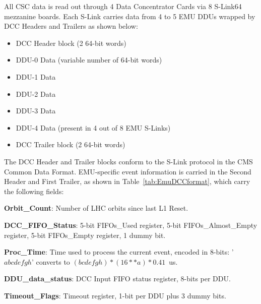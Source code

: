 All CSC data is read out through 4 Data Concentrator Cards
via 8 S-Link64 mezzanine boards.  
Each S-Link carries data from 4 to 5 EMU DDUs wrapped by DCC Headers
and Trailers as shown below:
\begin{itemize}
\item   DCC Header block (2 64-bit words)
\item   DDU-0 Data  (variable number of 64-bit words)
\item   DDU-1 Data
\item   DDU-2 Data
\item   DDU-3 Data
\item   DDU-4 Data  (present in 4 out of 8 EMU S-Links)
\item   DCC Trailer block (2 64-bit words)
\end{itemize}
The DCC Header and Trailer blocks conform to the S-Link protocol in
the CMS Common Data Format.  EMU-specific event information is carried
in the Second Header and First Trailer, as shown in
Table~\ref{tab:EmuDCCformat}, which carry the following fields:
\begin{description}
\item {\bf Orbit\_Count}: Number of LHC orbits since last L1 Reset.
\item {\bf DCC\_FIFO\_Status}: 5-bit FIFOs\_Used register, 
5-bit FIFOs\_Almost\_Empty register, 5-bit FIFOs\_Empty register, 1 dummy bit.
\item {\bf Proc\_Time}: Time used to process the current event, encoded in
8-bits: '$a b c d e f g h$' converts to $(bcdefgh)*(16**a)*0.41$~us.
\item {\bf DDU\_data\_status}: DCC Input FIFO status register, 8-bits per DDU.
\item {\bf Timeout\_Flags}: Timeout register, 1-bit per DDU plus 3 dummy bits.
\end{description}

